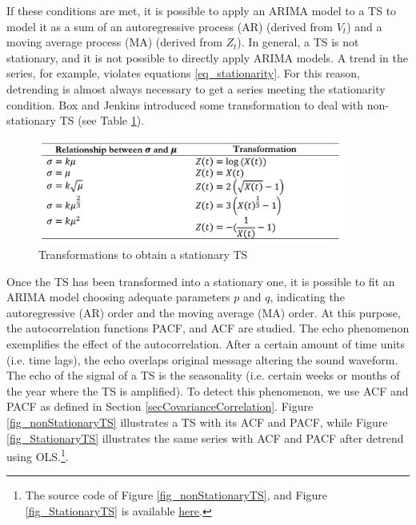 If these conditions are met, it is possible to apply an ARIMA model to a TS to model it as a sum of an autoregressive process (AR) (derived from $V_t$) and a moving average process (MA) (derived from $Z_t$). In general, a TS is not stationary, and it is not possible to directly apply ARIMA models. A trend in the series, for example, violates equations \ref{eq_stationarity}. For this reason, detrending is almost always necessary to get a series meeting the stationarity condition. Box and Jenkins \cite{Box1970} introduced some transformation to deal with non-stationary TS (see Table \ref{tab_transformation}).


\begin{figure}[hbt!]
\centering
\includegraphics[width=0.9\textwidth]{SectionLetsMath/elemStat_figures/tab_transformation.png}
\captionsetup{type=table}
\caption{Transformations to obtain a stationary TS}
\label{tab_transformation}
\end{figure}


Once the TS has been transformed into a stationary one, it is possible to fit an ARIMA model choosing adequate parameters $p$ and $q$, indicating the autoregressive (AR) order and the moving average (MA) order. At this purpose, the autocorrelation functions PACF, and ACF are studied. The echo phenomenon exemplifies the effect of the autocorrelation. After a certain amount of time units (i.e. time lags), the echo overlaps original message altering the sound waveform. The echo of the signal of a TS is the seasonality (i.e. certain weeks or months of the year where the TS is amplified). To detect this phenomenon, we use ACF and PACF as defined in Section \ref{secCovarianceCorrelation}. Figure \ref{fig_nonStationaryTS} illustrates a TS with its ACF and PACF, while Figure \ref{fig_StationaryTS} illustrates the same series with ACF and PACF after detrend using OLS.\footnote{The source code of Figure \ref{fig_nonStationaryTS}, and Figure \ref{fig_StationaryTS} is available \href{https://github.com/aletuf93/logproj/blob/master/examples/03.\%20Statistics.ipynb}{here}.}.


